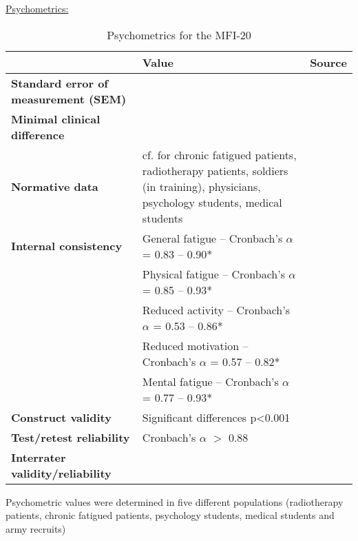 \underline{Psychometrics:}
\begin{table}[H]
\begin{tabularx}{1\textwidth}[H]{| >{\raggedright\arraybackslash}X | >{\raggedright\arraybackslash}X | >{\raggedright\arraybackslash}X | }
\caption{Psychometrics for the \acl{MFI-20}}\\ \hline
                                             & Value                                                               & Source                \\ \hline
\textbf{Standard error of measurement (SEM)} &                                                                     &                       \\ \hline
\textbf{Minimal clinical difference}         &                                                                     &                       \\ \hline
\textbf{Normative data}                      & cf. \cite{smets1995mfi20} for chronic fatigued patients,
                                               radiotherapy patients, soldiers (in training), physicians,
                                               psychology students, medical students                               & \cite{smets1995mfi20} \\ \hline
\textbf{Internal consistency}                & General fatigue -- Cronbach's $\alpha$ = \num{.83} -- \num{.90}*    & \cite{smets1995mfi20} \\
                                             & Physical fatigue -- Cronbach's $\alpha$ = \num{.85} -- \num{.93}*   & \cite{smets1995mfi20} \\
                                             & Reduced activity -- Cronbach's $\alpha$ = \num{.53} -- \num{.86}*   & \cite{smets1995mfi20} \\
                                             & Reduced motivation -- Cronbach's $\alpha$ = \num{.57} -- \num{.82}* & \cite{smets1995mfi20} \\
                                             & Mental fatigue -- Cronbach's $\alpha$ = \num{.77} -- \num{.93}*     & \cite{smets1995mfi20} \\ \hline
\textbf{Construct validity}                  & Significant differences p<\num{0.001}                               & \cite{smets1995mfi20} \\ \hline
\textbf{Test/retest reliability}             & Cronbach's $\alpha$ $>$ \num{.88}                                   & \cite{hinz2020mfi20}  \\ \hline
\textbf{Interrater validity/reliability}     &                                                                     &                       \\ \hline
\end{tabularx}

\bigskip
\footnotesize{
Psychometric values were determined in five different populations
(radiotherapy patients, chronic fatigued patients, psychology
students, medical students and army recruits)
}
\end{table}

